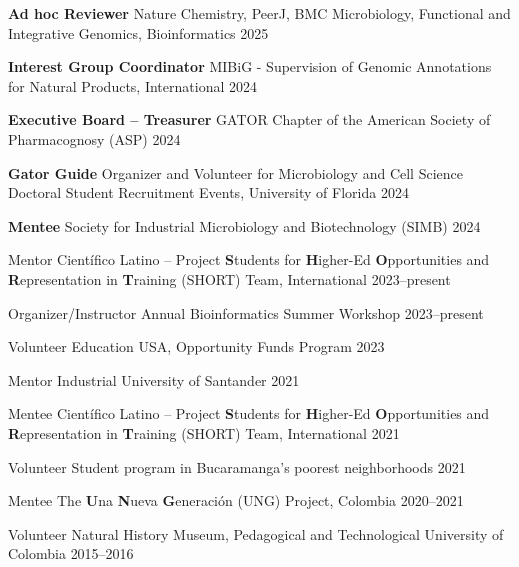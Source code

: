 {}
\begin{cvhonors}

\cvhonor
{\textbf{Ad hoc Reviewer}}
{Nature Chemistry, PeerJ, BMC Microbiology, Functional and Integrative Genomics, Bioinformatics}
{2025}

\cvhonor
{\textbf{Interest Group Coordinator}}
{MIBiG - Supervision of Genomic Annotations for Natural Products, International}
{2024}

\cvhonor
{\textbf{Executive Board -- Treasurer}}
{GATOR Chapter of the American Society of Pharmacognosy (ASP)}
{2024}

\cvhonor
{\textbf{Gator Guide}}
{Organizer and Volunteer for Microbiology and Cell Science Doctoral Student Recruitment Events, University of Florida}
{2024}

\cvhonor
{\textbf{Mentee}}
{Society for Industrial Microbiology and Biotechnology (SIMB)}
{2024}

\end{cvhonors} \begin{cvhonors}


\cvhonor
{Mentor}
{Científico Latino – Project \textbf{S}tudents for \textbf{H}igher-Ed \textbf{O}pportunities and \textbf{R}epresentation in \textbf{T}raining (SHORT) Team, International}
{2023--present}

\cvhonor
{Organizer/Instructor}
{Annual Bioinformatics Summer Workshop}
{2023--present}

\cvhonor
{Volunteer}
{Education USA, Opportunity Funds Program}
{2023}

\cvhonor
{Mentor}
{Industrial University of Santander}
{2021}

\cvhonor
{Mentee}
{Científico Latino – Project \textbf{S}tudents for \textbf{H}igher-Ed \textbf{O}pportunities and \textbf{R}epresentation in \textbf{T}raining (SHORT) Team, International}
{2021}

\cvhonor
{Volunteer}
{Student program in Bucaramanga's poorest neighborhoods}
{2021}

\cvhonor
{Mentee}
{The \textbf{U}na \textbf{N}ueva \textbf{G}eneración (UNG) Project, Colombia}
{2020--2021}

\cvhonor
{Volunteer}
{Natural History Museum, Pedagogical and Technological University of Colombia}
{2015--2016}

\end{cvhonors}